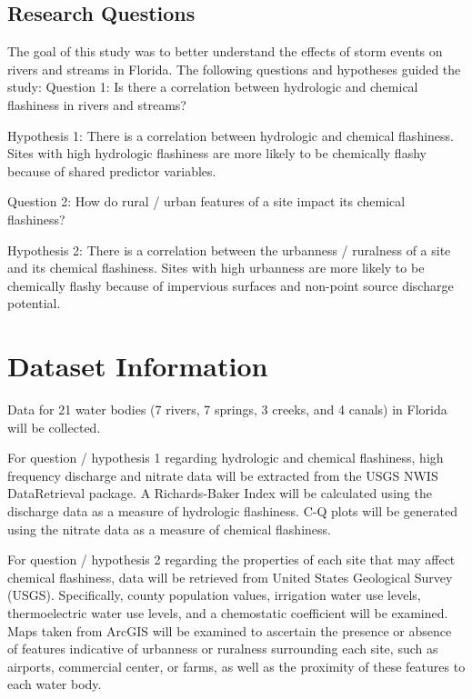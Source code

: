 \documentclass[12pt,]{article}
\begin{document}
\hypertarget{research-questions}{%
\subsection{Research Questions}\label{research-questions}}

The goal of this study was to better understand the effects of storm
events on rivers and streams in Florida. The following questions and
hypotheses guided the study: Question 1: Is there a correlation between
hydrologic and chemical flashiness in rivers and streams?

Hypothesis 1: There is a correlation between hydrologic and chemical
flashiness. Sites with high hydrologic flashiness are more likely to be
chemically flashy because of shared predictor variables.

Question 2: How do rural / urban features of a site impact its chemical
flashiness?

Hypothesis 2: There is a correlation between the urbanness / ruralness
of a site and its chemical flashiness. Sites with high urbanness are
more likely to be chemically flashy because of impervious surfaces and
non-point source discharge potential.

\newpage

\hypertarget{dataset-information}{%
\section{Dataset Information}\label{dataset-information}}

Data for 21 water bodies (7 rivers, 7 springs, 3 creeks, and 4 canals)
in Florida will be collected.

For question / hypothesis 1 regarding hydrologic and chemical
flashiness, high frequency discharge and nitrate data will be extracted
from the USGS NWIS DataRetrieval package. A Richards-Baker Index will be
calculated using the discharge data as a measure of hydrologic
flashiness. C-Q plots will be generated using the nitrate data as a
measure of chemical flashiness.

For question / hypothesis 2 regarding the properties of each site that
may affect chemical flashiness, data will be retrieved from United
States Geological Survey (USGS). Specifically, county population values,
irrigation water use levels, thermoelectric water use levels, and a
chemostatic coefficient will be examined. Maps taken from ArcGIS will be
examined to ascertain the presence or absence of features indicative of
urbanness or ruralness surrounding each site, such as airports,
commercial center, or farms, as well as the proximity of these features
to each water body.
\end{document}

